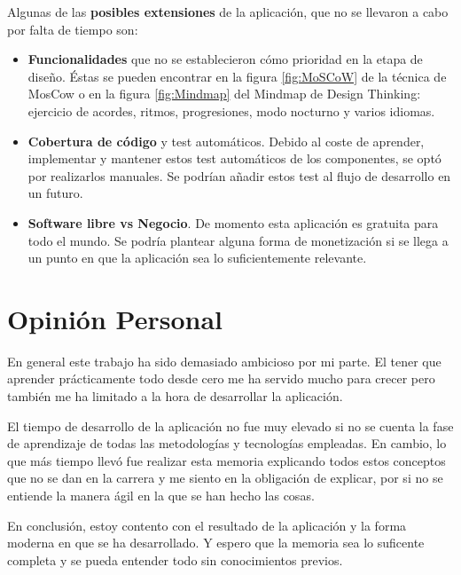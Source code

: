 \documentclass[12pt,twoside,titlepage]{report}
\newcommand\blankpage{%
    \newpage
    \null
    \thispagestyle{empty}%
    \newpage}
\begin{document}
Algunas de las \textbf{posibles extensiones} de la aplicación, que no se llevaron a cabo por falta de tiempo son:

\begin{itemize}
    \item \textbf{Funcionalidades} que no se establecieron cómo prioridad en la etapa de diseño. Éstas se pueden encontrar en la figura \ref{fig:MoSCoW} de la técnica de MosCow o en la figura \ref{fig:Mindmap} del Mindmap de Design Thinking: ejercicio de acordes, ritmos, progresiones, modo nocturno y varios idiomas.
    \item \textbf{Cobertura de código} y test automáticos. Debido al coste de aprender, implementar y mantener estos test automáticos de los componentes, se optó por realizarlos manuales. Se podrían añadir estos test al flujo de desarrollo en un futuro.
    \item \textbf{Software libre vs Negocio}. De momento esta aplicación es gratuita para todo el mundo. Se podría plantear alguna forma de monetización si se llega a un punto en que la aplicación sea lo suficientemente relevante.
\end{itemize}

\section{Opinión Personal}
En general este trabajo ha sido demasiado ambicioso por mi parte. El tener que aprender prácticamente todo desde cero me ha servido mucho para crecer pero también me ha limitado a la hora de desarrollar la aplicación.

El tiempo de desarrollo de la aplicación no fue muy elevado si no se cuenta la fase de aprendizaje de todas las metodologías y tecnologías empleadas. En cambio, lo que más tiempo llevó fue realizar esta memoria explicando todos estos conceptos que no se dan en la carrera y me siento en la obligación de explicar, por si no se entiende la manera ágil en la que se han hecho las cosas.

En conclusión, estoy contento con el resultado de la aplicación y la forma moderna en que se ha desarrollado. Y espero que la memoria sea lo suficente completa y se pueda entender todo sin conocimientos previos.

\blankpage




{}
\footnotesize{
%


}
\raggedbottom
\afterpage{\blankpage}
\newpage
\end{document}
